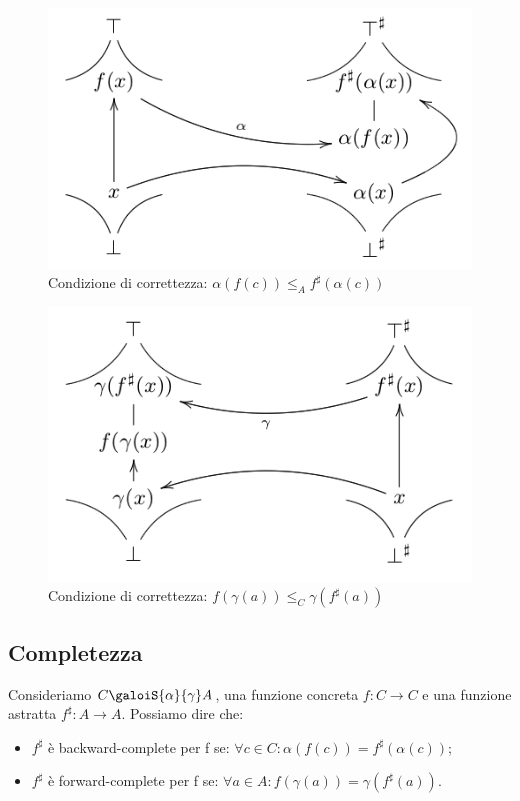 \documentclass{article}
\begin{document}
            \begin{multicols}{2}	
                \begin{figure}[H]
                    \centering
                    \includegraphics[scale=0.35]{Correttezza}
                    \caption{Condizione di correttezza: $\alpha(f(c))\leq_A f^{\sharp}(\alpha(c))$}
                    \label{Correct}
                \end{figure}
                \columnbreak
                \begin{figure}[H]
                    \centering
                    \includegraphics[scale=0.35]{CorrettezzaAstr}
                    \caption{Condizione di correttezza: $f(\gamma(a))\leq_C \gamma(f^{\sharp}(a))$}
                    \label{CorrectAbstr}
                \end{figure}
            \end{multicols}
        
        \subsection{Completezza}
            Consideriamo $C \galoiS{\alpha}{\gamma} A$, una funzione concreta $f: C\rightarrow C$ e una funzione astratta $f^{\sharp}: A\rightarrow A$. Possiamo dire che:
            \begin{itemize}
                \item $f^{\sharp}$ è backward-complete per f se: $\forall c\in C: \alpha(f(c))=f^{\sharp}(\alpha(c))$;
                \item $f^{\sharp}$ è forward-complete per f se: $\forall a\in A: f(\gamma(a))=\gamma(f^{\sharp}(a))$.
            \end{itemize}
            
\end{document}

